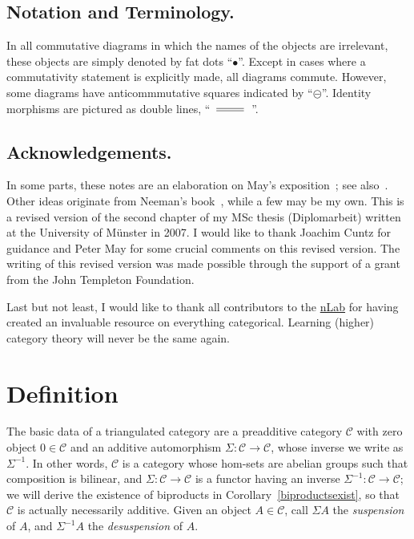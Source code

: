 \documentclass{amsproc}
\theoremstyle{definition}
\begin{document}
\subsection*{Notation and Terminology.} In all commutative diagrams in which the names of the objects are irrelevant, these objects are simply denoted by fat dots ``$\bullet$''. Except in cases where a commutativity statement is explicitly made, all diagrams commute. However, some diagrams have anticommmutative squares indicated by ``$\circleddash$''. Identity morphisms are pictured as double lines, ``\!\!$\xymatrix{\ar@{=}[r]&}$\!\!''. 

\subsection*{Acknowledgements.} In some parts, these notes are an elaboration on May's exposition~\cite[Sec.~2]{MayAdd}; see also~\cite{May}. Other ideas originate from Neeman's book~\cite{Nee}, while a few may be my own. This is a revised version of the second chapter of my MSc thesis (Diplomarbeit) written at the University of M\"unster in 2007. I would like to thank Joachim Cuntz for guidance and Peter May for some crucial comments on this revised version. The writing of this revised version was made possible through the support of a grant from the John Templeton Foundation.

Last but not least, I would like to thank all contributors to the \href{http://ncatlab.org/nlab/show/HomePage}{nLab} for having created an invaluable resource on everything categorical. Learning (higher) category theory will never be the same again.

\section{Definition}
\label{definition}

The basic data of a triangulated category are a preadditive category ${\mathcal{C}}$ with zero object $0\in{\mathcal{C}}$ and an additive automorphism $\Sigma:{\mathcal{C}}{\longrightarrow}{\mathcal{C}}$, whose inverse we write as $\Sigma^{-1}$. In other words, ${\mathcal{C}}$ is a category whose hom-sets are abelian groups such that composition is bilinear, and $\Sigma:{\mathcal{C}}{\longrightarrow}{\mathcal{C}}$ is a functor having an inverse $\Sigma^{-1} : {\mathcal{C}} {\longrightarrow} {\mathcal{C}}$; we will derive the existence of biproducts in Corollary~\ref{biproductsexist}, so that ${\mathcal{C}}$ is actually necessarily additive. Given an object $A\in{\mathcal{C}}$, call $\Sigma A$ the \emph{suspension} of $A$, and $\Sigma^{-1}A$ the \emph{desuspension} of $A$. 
\end{document}
